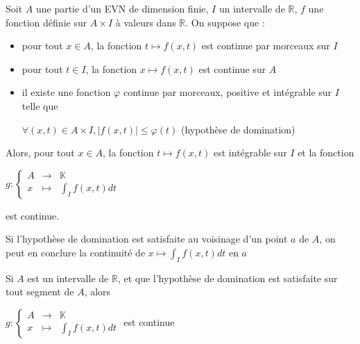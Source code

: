 \documentclass[a4paper,12pt]{book}
\newcommand{\Thr}[2]{\begin{tcolorbox}[sharp corners, colback=white,colframe=red!10!blue!30!green!75!, title=Théorème : #1]#2\end{tcolorbox}}
\def\R{\mathbb{R}}
\def\K{\mathbb{K}}
\begin{document}
\Thr{Continuité dominée}{Soit $A$ une partie d'un EVN de dimension finie, $I$ un intervalle de $\R$, $f$ une fonction définie sur $A\times I$ à valeurs dans $\R$. On suppose que :\begin{itemize}
\item pour tout $x\in A$, la fonction $t\mapsto f(x,t)$ est continue par morceaux sur $I$
\item pour tout $t\in I$, la fonction $x\mapsto f(x,t)$ est continue sur $A$
\item il existe une fonction $\varphi$ continue par morceaux, positive et intégrable sur $I$ telle que
\par \begin{center}$\forall (x,t)\in A\times I, \vert f(x,t)\vert\leq \varphi(t)$ (hypothèse de domination) \end{center}
\end{itemize}
Alors, pour tout $x\in A$, la fonction $t\mapsto f(x,t)$ est intégrable sur $I$ et la fonction
\par \begin{center} $g:\left\{\begin{array}{rcl}A & \to & \K \\ x & \mapsto & \int_If(x,t)dt\end{array}\right.$\end{center} \par est continue.}
\Thr{Extension}{Si l'hypothèse de domination est satisfaite au voisinage d'un point $a$ de $A$, on peut en conclure la continuité de $x\mapsto \int_If(x,t)dt$ en $a$
\par Si $A$ est un intervalle de $\R$, et que l'hypothèse de domination est satisfaite sur tout segment de $A$, alors
\par \begin{center} $g:\left\{\begin{array}{rcl}A&\to&\K\\x&\mapsto&\int_If(x,t)dt\end{array}\right.$ est continue\end{center}}
\end{document}
